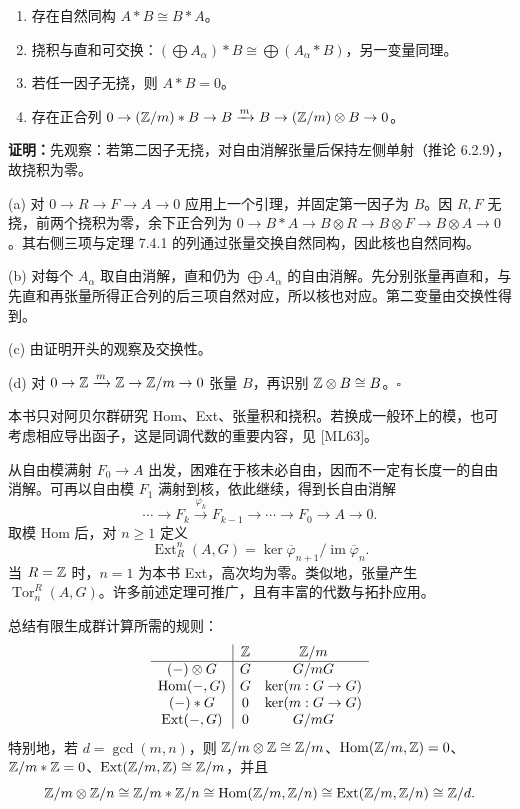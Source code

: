 \begin{enumerate}[label=(\alph*)]
\item 存在自然同构 $A*B\cong B*A$。
\item 挠积与直和可交换：$(\bigoplus A_\alpha)*B\cong\bigoplus(A_\alpha*B)$，另一变量同理。
\item 若任一因子无挠，则 $A*B=0$。
\item 存在正合列 $0\to(\mathbb{Z}/m)*B\to B\xrightarrow{m}B\to(\mathbb{Z}/m)\otimes B\to0$。
\end{enumerate}
\textbf{证明：}先观察：若第二因子无挠，对自由消解张量后保持左侧单射（推论 6.2.9），故挠积为零。

(a) 对 $0\to R\to F\to A\to0$ 应用上一个引理，并固定第一因子为 $B$。因 $R,F$ 无挠，前两个挠积为零，余下正合列为 $0\to B*A\to B\otimes R\to B\otimes F\to B\otimes A\to0$。其右侧三项与定理 7.4.1 的列通过张量交换自然同构，因此核也自然同构。

(b) 对每个 $A_\alpha$ 取自由消解，直和仍为 $\bigoplus A_\alpha$ 的自由消解。先分别张量再直和，与先直和再张量所得正合列的后三项自然对应，所以核也对应。第二变量由交换性得到。

(c) 由证明开头的观察及交换性。

(d) 对 $0\to\mathbb{Z}\xrightarrow{m}\mathbb{Z}\to\mathbb{Z}/m\to0$ 张量 $B$，再识别 $\mathbb{Z}\otimes B\cong B$。\hfill$\square$

本书只对阿贝尔群研究 Hom、Ext、张量积和挠积。若换成一般环上的模，也可考虑相应导出函子，这是同调代数的重要内容，见 [ML63]。

从自由模满射 $F_0\to A$ 出发，困难在于核未必自由，因而不一定有长度一的自由消解。可再以自由模 $F_1$ 满射到核，依此继续，得到长自由消解
\[
\cdots\to F_k\xrightarrow{\varphi_k}F_{k-1}\to\cdots\to F_0\to A\to0.
\]
取模 Hom 后，对 $n\ge1$ 定义
\[
\operatorname{Ext}_R^n(A,G)=\ker\overline\varphi_{n+1}/\operatorname{im}\overline\varphi_n.
\]
当 $R=\mathbb{Z}$ 时，$n=1$ 为本书 Ext，高次均为零。类似地，张量产生 $\operatorname{Tor}_n^R(A,G)$。许多前述定理可推广，且有丰富的代数与拓扑应用。

总结有限生成群计算所需的规则：
\[
\begin{array}{c|cc}
&\mathbb{Z}&\mathbb{Z}/m\\\hline
(-)\otimes G&G&G/mG\\
\operatorname{Hom}(-,G)&G&\ker(m:G\to G)\\
(-)*G&0&\ker(m:G\to G)\\
\operatorname{Ext}(-,G)&0&G/mG
\end{array}
\]
特别地，若 $d=\gcd(m,n)$，则 $\mathbb{Z}/m\otimes\mathbb{Z}\cong\mathbb{Z}/m$、$\operatorname{Hom}(\mathbb{Z}/m,\mathbb{Z})=0$、$\mathbb{Z}/m*\mathbb{Z}=0$、$\operatorname{Ext}(\mathbb{Z}/m,\mathbb{Z})\cong\mathbb{Z}/m$，并且
\[
\mathbb{Z}/m\otimes\mathbb{Z}/n\cong\mathbb{Z}/m*\mathbb{Z}/n\cong\operatorname{Hom}(\mathbb{Z}/m,\mathbb{Z}/n)
\cong\operatorname{Ext}(\mathbb{Z}/m,\mathbb{Z}/n)\cong\mathbb{Z}/d.
\]

